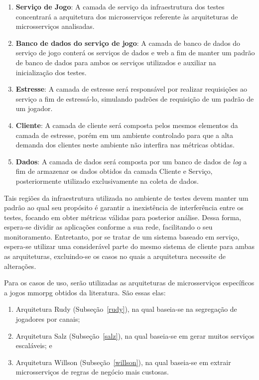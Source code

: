 \begin{enumerate}
  \item \textbf{Serviço de Jogo}: A camada de serviço da infraestrutura dos testes concentrará a arquitetura dos microsserviços referente às arquiteturas de microsserviços analisadas.
  \item \textbf{Banco de dados do serviço de jogo}: A camada de banco de dados do serviço de jogo conterá os serviços de dados e web a fim de manter um padrão de banco de dados para ambos os serviços utilizados e auxiliar na inicialização dos testes.
  \item \textbf{Estresse}: A camada de estresse será responsável por realizar requisições ao serviço a fim de estressá-lo, simulando padrões de requisição de um padrão de um jogador.
  \item \textbf{Cliente}: A camada de cliente será composta pelos mesmos elementos da camada de estresse, porém em um ambiente controlado para que a alta demanda dos clientes neste ambiente não interfira nas métricas obtidas.
  \item \textbf{Dados}: A camada de dados será composta por um banco de dados de \textit{log} a fim de armazenar os dados obtidos da camada Cliente e Serviço, posteriormente utilizado exclusivamente na coleta de dados.
\end{enumerate}



Tais regiões da infraestrutura utilizada no ambiente de testes devem manter um padrão ao qual seu propósito é garantir a inexistência de interferência entre os testes, focando em obter métricas válidas para posterior análise.
%
Dessa forma, espera-se dividir as aplicações conforme a sua rede, facilitando o seu monitoramento.
%
Entretanto, por se tratar de um sistema baseado em serviço, espera-se utilizar uma considerável parte do mesmo sistema de cliente para ambas as arquiteturas, excluindo-se os casos no quais a arquitetura necessite de alterações.




Para os casos de uso, serão utilizadas as arquiteturas de microsserviços específicos a jogos \ac{mmorpg} obtidos da literatura.
%
São essas elas:



\begin{enumerate}
  \item Arquitetura Rudy (Subseção~\ref{rudy}), na qual baseia-se na segregação de jogadores por canais;
  \item Arquitetura Salz (Subseção~\ref{salz}), na qual baseia-se em gerar muitos serviços escaláveis; e
  \item Arquitetura Willson (Subseção~\ref{willson}), na qual baseia-se em extrair microsserviços de regras de negócio mais custosas.
\end{enumerate}



